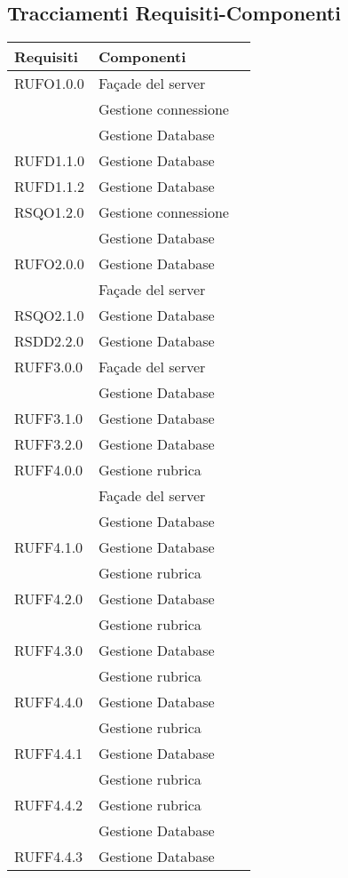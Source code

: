 \subsection{Tracciamenti Requisiti-Componenti}\label{sec:tracRecComp}

\begin{center}
\begin{longtable}{lp{}l}
\toprule Requisiti &  Componenti\\
\midrule
RUFO1.0.0 & Façade del server \\
 & Gestione connessione \\
 & Gestione Database \\
RUFD1.1.0 & Gestione Database \\
RUFD1.1.2 & Gestione Database \\
RSQO1.2.0 & Gestione connessione \\
 & Gestione Database \\
RUFO2.0.0 & Gestione Database \\
 & Façade del server \\
RSQO2.1.0 & Gestione Database \\
RSDD2.2.0 & Gestione Database \\
RUFF3.0.0 & Façade del server \\
 & Gestione Database \\
RUFF3.1.0 & Gestione Database \\
RUFF3.2.0 & Gestione Database \\
RUFF4.0.0 & Gestione rubrica \\
 & Façade del server \\
 & Gestione Database \\
RUFF4.1.0 & Gestione Database \\
 & Gestione rubrica \\
RUFF4.2.0 & Gestione Database \\
 & Gestione rubrica \\
RUFF4.3.0 & Gestione Database \\
 & Gestione rubrica \\
RUFF4.4.0 & Gestione Database \\
 & Gestione rubrica \\
RUFF4.4.1 & Gestione Database \\
 & Gestione rubrica \\
RUFF4.4.2 & Gestione rubrica \\
 & Gestione Database \\
RUFF4.4.3 & Gestione Database \\

\end{longtable}
\end{center}
